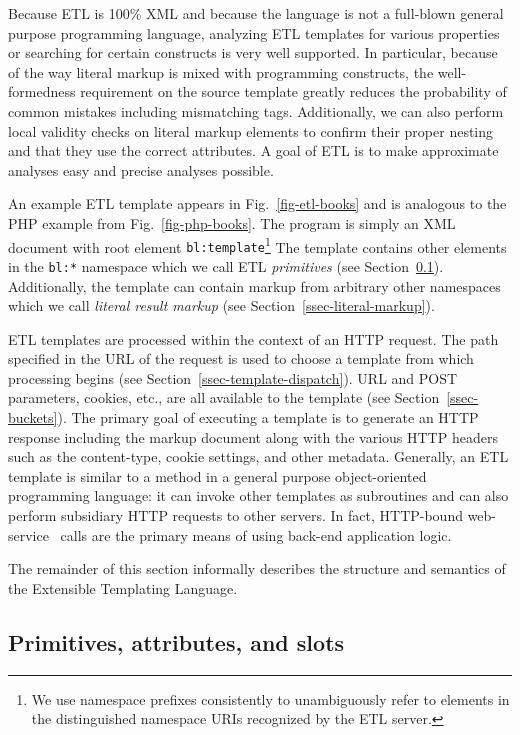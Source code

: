\documentclass{www2003-submission}
\newcommand{\smtexttt}[1]{{\small\texttt{#1}}}
\newcommand{\ns}[1]{{\small\texttt{#1:*}}}
\newcommand{\figref}[1]{Fig.~\ref{fig-#1}}
\newcommand{\ssecref}[1]{Section~\ref{ssec-#1}}
\begin{document}
Because ETL is 100\% XML and because the language is not a full-blown
general purpose programming language, analyzing ETL templates for
various properties or searching for certain constructs is very well
supported.  In particular, because of the way literal markup is mixed
with programming constructs, the well-formedness requirement on the
source template greatly reduces the probability of common mistakes
including mismatching tags.  Additionally, we can also perform local
validity checks on literal markup elements to confirm their proper
nesting and that they use the correct attributes.  A goal of ETL is to
make approximate analyses easy and precise analyses possible.

An example ETL template appears in \figref{etl-books} and is analogous
to the PHP example from \figref{php-books}.  The program is simply an
XML document with root element \smtexttt{bl:template}\footnote{We use
namespace prefixes consistently to unambiguously refer to elements in
the distinguished namespace URIs recognized by the ETL server.}  The
template contains other elements in the \ns{bl} namespace which we
call ETL \emph{primitives} (see \ssecref{primitives}).  Additionally,
the template can contain markup from arbitrary other namespaces which
we call \emph{literal result markup} (see \ssecref{literal-markup}).

ETL templates are processed within the context of an HTTP request.
The path specified in the URL of the request is used to choose a
template from which processing begins (see
\ssecref{template-dispatch}).  URL and POST parameters, cookies, etc.,
are all available to the template (see
\ssecref{buckets}). The primary goal of executing a template is to
generate an HTTP response including the markup document along with the
various HTTP headers such as the content-type, cookie settings, and
other metadata.  Generally, an ETL template is similar to a method in
a general purpose object-oriented programming language: it can invoke
other templates as subroutines and can also perform subsidiary HTTP
requests to other servers.  In fact, HTTP-bound
web-service~\cite{WebServicesActivity} calls are the primary means of using
back-end application logic.

The remainder of this section informally describes the structure and
semantics of the Extensible Templating Language.


\subsection{Primitives, attributes, and slots}
\label{ssec-primitives}
\end{document}
